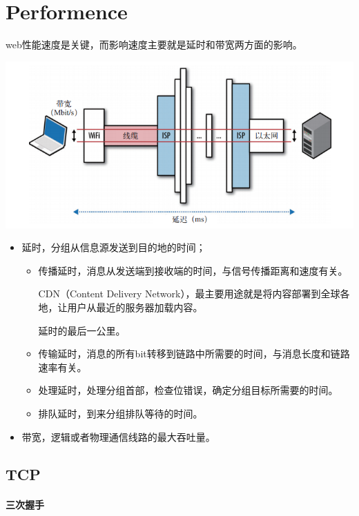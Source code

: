 \chapter{Performence}

web性能速度是关键，而影响速度主要就是延时和带宽两方面的影响。

\includegraphics[scale=1]{web/resources/delay-band.png}


\begin{itemize}
\item 延时，分组从信息源发送到目的地的时间；
\begin{itemize}
\item 传播延时，消息从发送端到接收端的时间，与信号传播距离和速度有关。

CDN（Content Delivery Network），最主要用途就是将内容部署到全球各地，让用户从最近的服务器加载内容。

延时的最后一公里。


\item 传输延时，消息的所有bit转移到链路中所需要的时间，与消息长度和链路速率有关。
\item 处理延时，处理分组首部，检查位错误，确定分组目标所需要的时间。
\item 排队延时，到来分组排队等待的时间。
\end{itemize}
\item 带宽，逻辑或者物理通信线路的最大吞吐量。
\end{itemize}



\section{TCP}

\subsubsection{三次握手}

